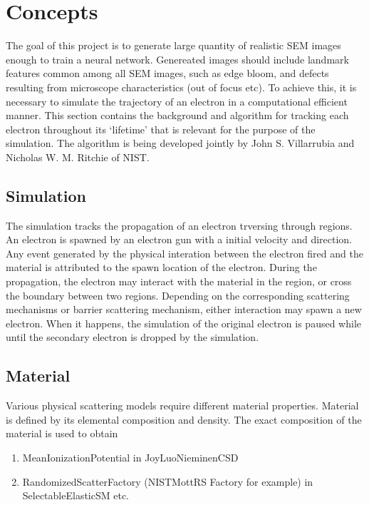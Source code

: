 \chapter{Concepts}\label{con}
The goal of this project is to generate large quantity of realistic SEM images enough to train a neural network. Genereated images should include landmark features common among all SEM images, such as edge bloom, and defects resulting from microscope characteristics (out of focus etc). To achieve this, it is necessary to simulate the trajectory of an electron in a computational efficient manner. This section contains the background and algorithm for tracking each electron throughout its `lifetime' that is relevant for the purpose of the simulation. The algorithm is being developed jointly by John S. Villarrubia and Nicholas W. M. Ritchie of NIST. 

\section{Simulation}\label{con:monte_carlo_ss}

The simulation tracks the propagation of an electron trversing through regions. An electron is spawned by an electron gun with a initial velocity and direction. Any event generated by the physical interation between the electron fired and the material is attributed to the spawn location of the electron. During the propagation, the electron may interact with the material in the region, or cross the boundary between two regions. Depending on the corresponding scattering mechanisms or barrier scattering mechanism, either interaction may spawn a new electron. When it happens, the simulation of the original electron is paused while until the secondary electron is dropped by the simulation. 

\section{Material}\label{con:material}
Various physical scattering models require different material properties. Material is defined by its elemental composition and density. The exact composition of the material is used to obtain 
\begin{enumerate}
\item MeanIonizationPotential in JoyLuoNieminenCSD
\item RandomizedScatterFactory (NISTMottRS Factory for example) in SelectableElasticSM etc.
\end{enumerate}

